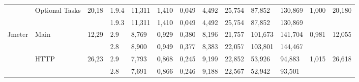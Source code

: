 \documentclass[12pt]{article}
\begin{document}
\begin{table}[h]
{\begin{tabular}{|l|l|c|l|l|l|l|l|l|l|l|c|c|}
\multicolumn{1}{|c|}{}                     & \multirow{2}{*}{Optional Tasks}       & \multirow{2}{*}{20,18}     & 1.9.4                             & 11,311                         & 1,410                          & 0,049                          & 4,492                          & 25,754                         & 87,852                          & 130,869                         & \multirow{2}{*}{1,000} & \multirow{2}{*}{20,180} \\ \cline{4-11}
\multicolumn{1}{|c|}{}                     &                                       &                            & 1.9.3                             & 11,311                         & 1,410                          & 0,049                          & 4,492                          & 25,754                         & 87,852                          & 130,869                         &                        &                         \\ \hline
\multirow{4}{*}{Jmeter}                    & \multirow{2}{*}{Main}                 & \multirow{2}{*}{12,29}     & 2.9                               & 8,769                          & 0,929                          & 0,380                          & 8,196                          & 21,757                         & 101,673                         & 141,704                         & \multirow{2}{*}{0,981} & \multirow{2}{*}{12,055} \\ \cline{4-11}
                                           &                                       &                            & 2.8                               & 8,900                          & 0,949                          & 0,377                          & 8,383                          & 22,057                         & 103,801                         & 144,467                         &                        &                         \\ \cline{2-13} 
                                           & \multirow{2}{*}{HTTP}                 & \multirow{2}{*}{26,23}     & 2.9                               & 7,793                          & 0,868                          & 0,245                          & 9,199                          & 22,852                         & 53,926                          & 94,883                          & \multirow{2}{*}{1,015} & \multirow{2}{*}{26,618} \\ \cline{4-11}
                                           &                                       &                            & 2.8                               & 7,691                          & 0,866                          & 0,246                          & 9,188                          & 22,567                         & 52,942                          & 93,501                          &                        &                         \\ \hline

\end{tabular}}
\end{table}
\end{document}
